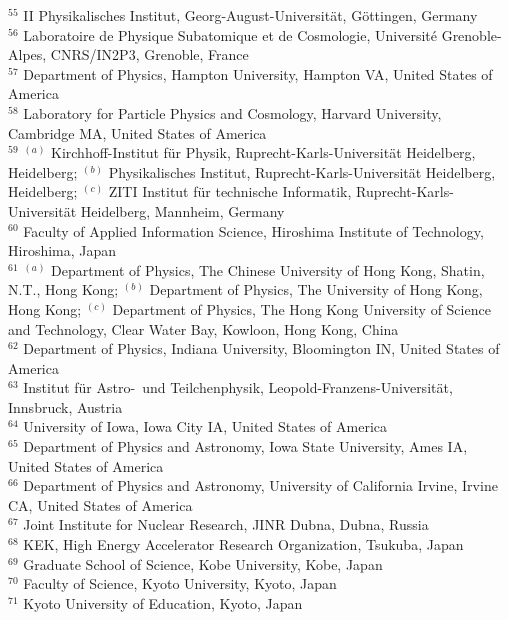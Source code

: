 \begin{flushleft}
$^{55}$ II Physikalisches Institut, Georg-August-Universit{\"a}t, G{\"o}ttingen, Germany\\
$^{56}$ Laboratoire de Physique Subatomique et de Cosmologie, Universit{\'e} Grenoble-Alpes, CNRS/IN2P3, Grenoble, France\\
$^{57}$ Department of Physics, Hampton University, Hampton VA, United States of America\\
$^{58}$ Laboratory for Particle Physics and Cosmology, Harvard University, Cambridge MA, United States of America\\
$^{59}$ $^{(a)}$ Kirchhoff-Institut f{\"u}r Physik, Ruprecht-Karls-Universit{\"a}t Heidelberg, Heidelberg; $^{(b)}$ Physikalisches Institut, Ruprecht-Karls-Universit{\"a}t Heidelberg, Heidelberg; $^{(c)}$ ZITI Institut f{\"u}r technische Informatik, Ruprecht-Karls-Universit{\"a}t Heidelberg, Mannheim, Germany\\
$^{60}$ Faculty of Applied Information Science, Hiroshima Institute of Technology, Hiroshima, Japan\\
$^{61}$ $^{(a)}$ Department of Physics, The Chinese University of Hong Kong, Shatin, N.T., Hong Kong; $^{(b)}$ Department of Physics, The University of Hong Kong, Hong Kong; $^{(c)}$ Department of Physics, The Hong Kong University of Science and Technology, Clear Water Bay, Kowloon, Hong Kong, China\\
$^{62}$ Department of Physics, Indiana University, Bloomington IN, United States of America\\
$^{63}$ Institut f{\"u}r Astro-{~}und Teilchenphysik, Leopold-Franzens-Universit{\"a}t, Innsbruck, Austria\\
$^{64}$ University of Iowa, Iowa City IA, United States of America\\
$^{65}$ Department of Physics and Astronomy, Iowa State University, Ames IA, United States of America\\
$^{66}$ Department of Physics and Astronomy, University of California Irvine, Irvine CA, United States of America\\
$^{67}$ Joint Institute for Nuclear Research, JINR Dubna, Dubna, Russia\\
$^{68}$ KEK, High Energy Accelerator Research Organization, Tsukuba, Japan\\
$^{69}$ Graduate School of Science, Kobe University, Kobe, Japan\\
$^{70}$ Faculty of Science, Kyoto University, Kyoto, Japan\\
$^{71}$ Kyoto University of Education, Kyoto, Japan\\

\end{flushleft}
